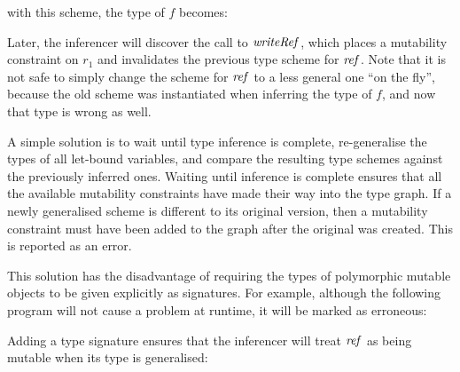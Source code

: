 
\clearpage{}

with this scheme, the type of $f$ becomes:


Later, the inferencer will discover the call to $\operatorname{\mathit{writeRef}}$, which places a mutability constraint on $r_1$ and invalidates the previous type scheme for $\operatorname{\mathit{ref}}$. Note that it is not safe to simply change the scheme for $\operatorname{\mathit{ref}}$ to a less general one ``on the fly'', because the old scheme was instantiated when inferring the type of $f$, and now that type is wrong as well. 

A simple solution is to wait until type inference is complete, re-generalise the types of all let-bound variables, and compare the resulting type schemes against the previously inferred ones. Waiting until inference is complete ensures that all the available mutability constraints have made their way into the type graph. If a newly generalised scheme is different to its original version, then a mutability constraint must have been added to the graph after the original was created. This is reported as an error.

This solution has the disadvantage of requiring the types of polymorphic mutable objects to be given explicitly as signatures. For example, although the following program will not cause a problem at runtime, it will be marked as erroneous:


Adding a type signature ensures that the inferencer will treat $\operatorname{\mathit{ref}}$ as being mutable when its type is generalised:


